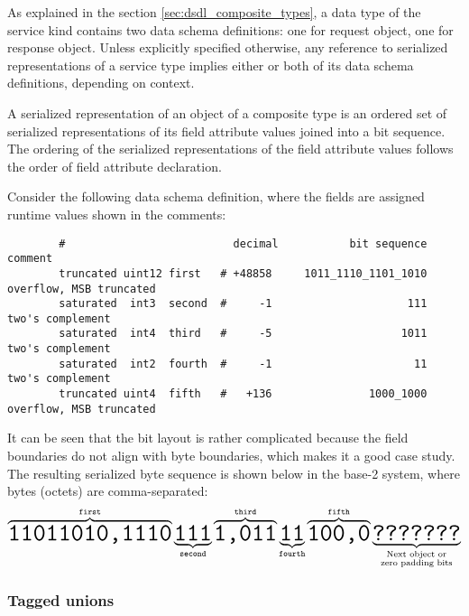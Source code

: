 As explained in the section \ref{sec:dsdl_composite_types}, a data type of the service kind contains
two data schema definitions: one for request object, one for response object.
Unless explicitly specified otherwise, any reference to serialized representations of a service type
implies either or both of its data schema definitions, depending on context.

A serialized representation of an object of a composite type is an ordered set of serialized representations of
its field attribute values joined into a bit sequence.
The ordering of the serialized representations of the field attribute values follows the order
of field attribute declaration.

\begin{remark}
    Consider the following data schema definition,
    where the fields are assigned runtime values shown in the comments:

    \begin{verbatim}
        #                          decimal           bit sequence   comment
        truncated uint12 first   # +48858     1011_1110_1101_1010   overflow, MSB truncated
        saturated  int3  second  #     -1                     111   two's complement
        saturated  int4  third   #     -5                    1011   two's complement
        saturated  int2  fourth  #     -1                      11   two's complement
        truncated uint4  fifth   #   +136               1000_1000   overflow, MSB truncated
    \end{verbatim}

    It can be seen that the bit layout is rather complicated because the field boundaries do not align with byte
    boundaries, which makes it a good case study.
    The resulting serialized byte sequence is shown below in the base-2 system,
    where bytes (octets) are comma-separated:
    $$
        \overbrace{\hugett{11011010,1110}}^{\texttt{first}}%
        \underbrace{\hugett{111}}_{\texttt{second}}%
        \overbrace{\hugett{1,011}}^{\texttt{third}}%
        \underbrace{\hugett{11}}_{\texttt{fourth}}%
        \overbrace{\hugett{100,0}}^{\texttt{fifth}}%
        \underbrace{\hugett{???????}}_{\substack{\text{Next object or} \\ \text{zero padding bits}}}
    $$
\end{remark}

\subsubsection{Tagged unions}

